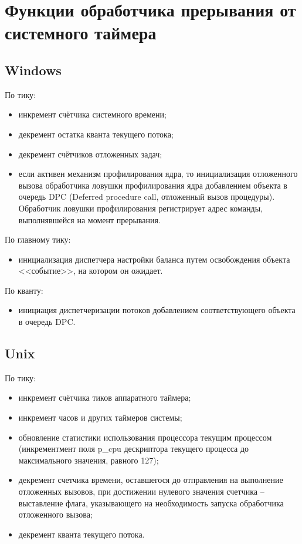 \chapter{Функции обработчика прерывания от системного таймера}


\section{Windows}

По тику:
\begin{itemize}
	\item инкремент счётчика системного времени;
	\item декремент остатка кванта текущего потока;
	\item декремент счётчиков отложенных задач;
	\item если активен механизм профилирования ядра, то инициализация отложенного вызова обработчика ловушки профилирования ядра добавлением объекта в очередь DPC (Deferred procedure call, отложенный вызов процедуры). Обработчик ловушки профилирования регистрирует адрес команды, выполнявшейся на момент прерывания. 
\end{itemize}

По главному тику: 
\begin{itemize}
	\item инициализация диспетчера настройки баланса путем освобождения объекта <<событие>>, на котором он ожидает.
\end{itemize}

По кванту:
\begin{itemize}
	\item инициация диспетчеризации потоков добавлением соответствующего объекта в очередь DPC.
\end{itemize}

\section{Unix}

По тику:

\begin{itemize}
	\item инкремент счётчика тиков аппаратного таймера;
	\item инкремент часов и других таймеров системы;
	\item обновление статистики использования процессора текущим процессом (инкрементмент поля p\_cpu дескриптора текущего процесса до максимального значения, равного 127);
	\item декремент счетчика времени, оставшегося до отправления на выполнение отложенных вызовов, при достижении нулевого значения счетчика -- выставление флага, указывающего на необходимость запуска обработчика отложенного вызова;
	\item декремент кванта текущего потока.
\end{itemize}

